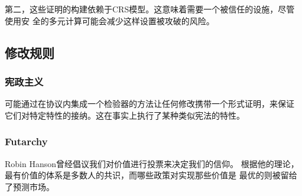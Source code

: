 \documentclass[letterpaper]{article}
\begin{document}
第二，这些证明的构建依赖于CRS模型。这意味着需要一个被信任的设施，尽管使用安
全的多元计算可能会减少这样设置被攻破的风险。

\subsection{修改规则}

\subsubsection{宪政主义}

可能通过在协议内集成一个检验器的方法让任何修改携带一个形式证明，来保证
它们对特定特性的接纳。这在事实上执行了某种类似宪法的特性。


\subsubsection{Futarchy}
Robin Hanson曾经倡议我们对价值进行投票来决定我们的信仰\cite{Futarchy}。
根据他的理论，最有价值的体系是多数人的共识，而哪些政策对实现那些价值是
最优的则被留给了预测市场。
\end{document}
